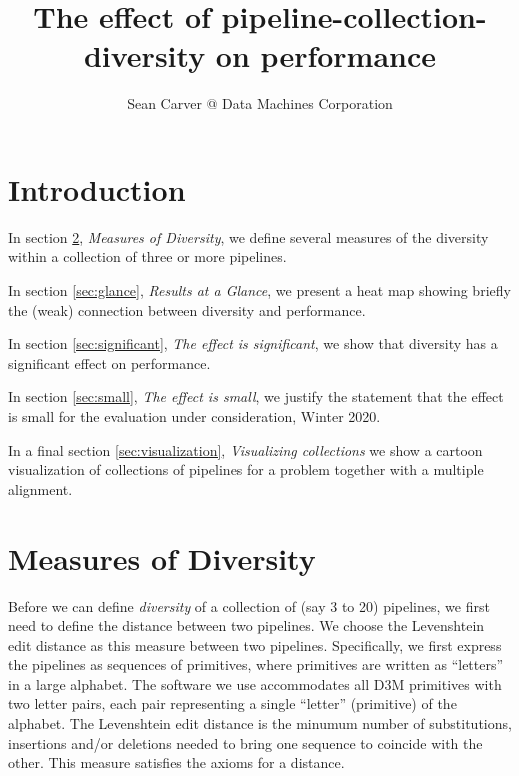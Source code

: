 \documentclass{article}
\title{The effect of pipeline-collection-diversity on performance}
\author{Sean Carver @ Data Machines Corporation}
\begin{document}
\maketitle


\section{Introduction}
In section \ref{sec:measures}, \emph{Measures of Diversity}, we define
several measures of the diversity within a collection of three or more
pipelines.

In section \ref{sec:glance}, \emph{Results at a Glance}, we present a
heat map showing briefly the (weak) connection between diversity and
performance.

In section \ref{sec:significant}, \emph{The effect is significant}, we
show that diversity has a significant effect on performance.

In section \ref{sec:small}, \emph{The effect is small}, we justify the
statement that the effect is small for the evaluation under
consideration, Winter 2020.

In a final section \ref{sec:visualization}, \emph{Visualizing
  collections} we show a cartoon visualization of collections of
pipelines for a problem together with a multiple alignment.

\section{Measures of Diversity}
\label{sec:measures}
Before we can define \emph{diversity} of a collection of (say 3 to 20)
pipelines, we first need to define the distance between two pipelines.
We choose the Levenshtein edit distance as this measure between two
pipelines.  Specifically, we first express the pipelines as sequences
of primitives, where primitives are written as ``letters'' in a large
alphabet.  The software we use accommodates all D3M primitives with
two letter pairs, each pair representing a single ``letter''
(primitive) of the alphabet.  The Levenshtein edit distance is the
minumum number of substitutions, insertions and/or deletions needed to
bring one sequence to coincide with the other.  This measure satisfies
the axioms for a distance.
\end{document}
